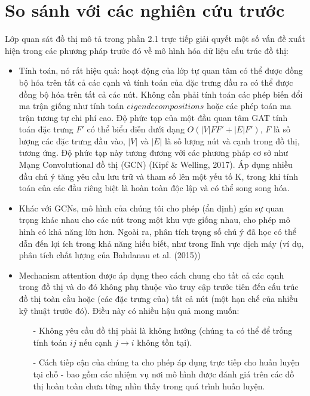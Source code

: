 \section{So sánh với các nghiên cứu trước}
\label{sec:So sánh với các nghiên cứu trước}
Lớp quan sát đồ thị mô tả trong phần 2.1 trực tiếp giải quyết một số vấn đề xuất hiện trong các phương pháp trước đó về mô hình hóa dữ liệu cấu trúc đồ thị:
	\begin{itemize}
		\item Tính toán, nó rất hiệu quả: hoạt động của lớp tự quan tâm có thể được đồng bộ hóa trên tất cả các cạnh và tính toán của đặc trưng đầu ra có thể được đồng bộ hóa trên tất cả các nút. Không cần phải tính toán các phép biến đổi ma trận giống như tính toán $eigendecompositions$ hoặc các phép toán ma trận tương tự chi phí cao. Độ phức tạp của một đầu quan tâm GAT tính toán đặc trưng $F'$ có thể biểu diễn dưới dạng $O(|V|F F' + |E|F')$, $F$ là số lượng các đặc trưng đầu vào, $|V|$ và $|E|$ là số lượng nút và cạnh trong đồ thị, tương ứng. Độ phức tạp này tương đương với các phương pháp cơ sở như Mạng Convolutional đồ thị (GCN) (Kipf \& Welling, 2017). Áp dụng nhiều đầu chú ý tăng yêu cầu lưu trữ và tham số lên một yếu tố K, trong khi tính toán của các đầu riêng biệt là hoàn toàn độc lập và có thể song song hóa.
		
		\item Khác với GCNs, mô hình của chúng tôi cho phép (ẩn định) gán sự quan trọng khác nhau cho các nút trong một khu vực giống nhau, cho phép mô hình có khả năng lớn hơn. Ngoài ra, phân tích trọng số chú ý đã học có thể dẫn đến lợi ích trong khả năng hiểu biết, như trong lĩnh vực dịch máy (ví dụ, phân tích chất lượng của Bahdanau et al. (2015))
		
		\item Mechanism attention được áp dụng theo cách chung cho tất cả các cạnh trong đồ thị và do đó không phụ thuộc vào truy cập trước tiên đến cấu trúc đồ thị toàn cầu hoặc (các đặc trưng của) tất cả nút (một hạn chế của nhiều kỹ thuật trước đó). Điều này có nhiều hậu quả mong muốn:
			\begin{itemize}
				\item[-] Không yêu cầu đồ thị phải là không hướng (chúng ta có thể để trống tính toán $ij$ nếu cạnh 
				\(j \longrightarrow i\)
				không tồn tại).
				
				\item[-] Cách tiếp cận của chúng ta cho phép áp dụng trực tiếp cho huấn luyện tại chỗ - bao gồm các nhiệm vụ nơi mô hình được đánh giá trên các đồ thị hoàn toàn chưa từng nhìn thấy trong quá trình huấn luyện.
			\end{itemize}
		

\end{itemize}
